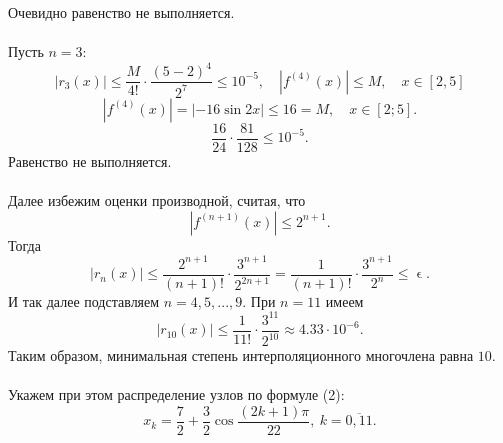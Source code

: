 \documentclass[a4paper, 12pt]{article}
\renewcommand{\leq}{\leqslant}
\renewcommand{\epsilon}{\upvarepsilon}
\begin{document}
	Очевидно равенство не выполняется.\\\\
	Пусть $n=3$:
	$$|r_3(x)| \leq \dfrac{M}{4!}\cdot \dfrac{(5-2)^{4}}{2^{7}}\leq 10^{-5},\quad |f^{(4)}(x)|\leq M,\quad x\in [2,5]$$
	$$|f^{(4)}(x)| = |-16\sin2x| \leq 16 = M,\quad x\in [2;5].$$
	$$\dfrac{16}{24}\cdot \dfrac{81}{128}\leq 10^{-5}.$$
	Равенство не выполняется.
	\\\\
	Далее избежим оценки производной, считая, что $$|f^{(n+1)}(x)|\leq 2^{n+1}.$$
	Тогда $$|r_n(x)| \leq \dfrac{2^{n+1}}{(n+1)!}\cdot \dfrac{3^{n+1}}{2^{2n+1}} = \dfrac{1}{(n+1)!}\cdot \dfrac{3^{n+1}}{2^{n}}\leq \epsilon.$$
	И так далее подставляем $n=4,5,...,9$. При $n=11$ имеем $$|r_{10}(x)| \leq \dfrac{1}{11!}\cdot \dfrac{3^{11}}{2^{10}}\approx 4.33\cdot 10^{-6}.$$
	Таким образом, минимальная степень интерполяционного многочлена равна $10$.\\\\
	Укажем при этом распределение узлов по формуле (2):
	$$	x_k = \dfrac{7}{2} + \dfrac{3}{2}\cos \dfrac{(2k+1)\pi}{22},\ k=\overline{0,11}.$$
\end{document}
